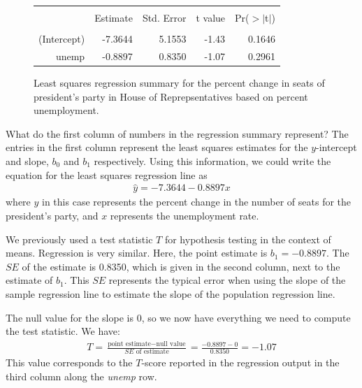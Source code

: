 \begin{figure}[h]
\centering
\begin{tabular}{rrrrr}
  \hline
  \vspace{-3.7mm} & & & & \\
 & Estimate & Std. Error & t value & Pr($>$$|$t$|$) \\ 
  \hline
  \vspace{-3.6mm} & & & & \\
(Intercept) & -7.3644  & 5.1553 & -1.43 & 0.1646\\ 
unemp & -0.8897 & 0.8350 & -1.07 & 0.2961 \\ 
   \hline
\end{tabular}
\caption{Least squares regression summary for the percent change in seats of president's party in House of Reprepsentatives based on percent unemployment.}
\label{midtermElectionUnemploymentRRegressionOutput}
\end{figure}




\begin{examplewrap}
\begin{nexample}{What do the first column of numbers in the regression summary represent?}
The entries in the first column represent the least squares estimates for the $y$-intercept and slope, $b_0$ and $b_1$ respectively.  Using this information, we could write the equation
  for the least squares regression line as
  \begin{align*}
  \hat{y} = -7.3644 - 0.8897 x
  \end{align*}
  where $y$ in this case represents the percent change in the number
  of seats for the president's party,
  and $x$ represents the unemployment rate.
\end{nexample}
\end{examplewrap}

We previously used a test statistic $T$ for hypothesis testing in the context of means. Regression is very similar. Here, the point estimate is $b_1=-0.8897$.  The $SE$ of the estimate is 0.8350, which is given in the second column, next to the estimate of $b_1$.  This $SE$ represents the typical error when using the slope of the sample regression line to estimate the slope of the population regression line.

The null value for the slope is 0, so we now have everything we need to compute the test statistic.  We have: 
\begin{align*}
T = \frac{\text{point estimate} - \text{null value}}{SE \text{ of estimate}} = \frac{-0.8897 - 0}{0.8350} = -1.07
\end{align*}
This value corresponds to the $T$-score reported in the regression output in the third column along the \emph{unemp} row.  

